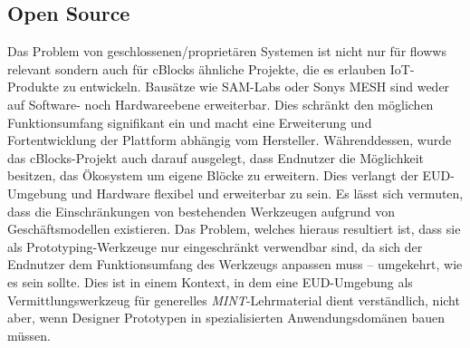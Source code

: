\subsection{Open Source}
Das Problem von geschlossenen/proprietären Systemen ist nicht nur für flowws relevant sondern auch für cBlocks ähnliche Projekte, die es erlauben \ac{IoT}-Produkte zu entwickeln. Bausätze wie SAM-Labs oder Sonys MESH sind weder auf Software- noch Hardwareebene erweiterbar. Dies schränkt den möglichen Funktionsumfang signifikant ein und macht eine Erweiterung und Fortentwicklung der Plattform abhängig vom Hersteller. Währenddessen, wurde das cBlocks-Projekt auch darauf ausgelegt, dass Endnutzer die Möglichkeit besitzen, das Ökosystem um eigene Blöcke zu erweitern. Dies verlangt der \ac{EUD}-Umgebung und Hardware flexibel und erweiterbar zu sein. Es lässt sich vermuten, dass die Einschränkungen von bestehenden Werkzeugen aufgrund von Geschäftsmodellen existieren. Das Problem, welches hieraus resultiert ist, dass sie als Prototyping-Werkzeuge nur eingeschränkt verwendbar sind, da sich der Endnutzer dem Funktionsumfang des Werkzeugs anpassen muss -- umgekehrt, wie es sein sollte. Dies ist in einem Kontext, in dem eine \ac{EUD}-Umgebung als Vermittlungswerkzeug für generelles \textit{MINT}-Lehrmaterial dient verständlich, nicht aber, wenn Designer Prototypen in spezialisierten Anwendungsdomänen bauen müssen.
